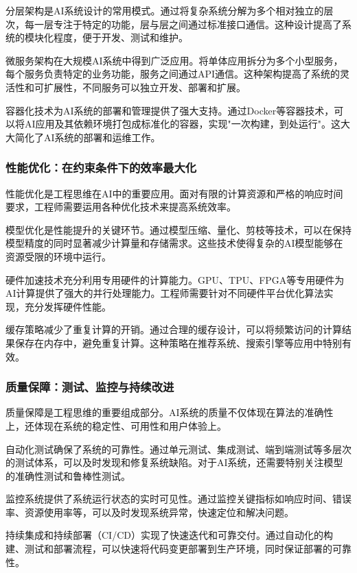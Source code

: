 分层架构是AI系统设计的常用模式。通过将复杂系统分解为多个相对独立的层次，每一层专注于特定的功能，层与层之间通过标准接口通信。这种设计提高了系统的模块化程度，便于开发、测试和维护。

微服务架构在大规模AI系统中得到广泛应用。将单体应用拆分为多个小型服务，每个服务负责特定的业务功能，服务之间通过API通信。这种架构提高了系统的灵活性和可扩展性，不同服务可以独立开发、部署和扩展。

容器化技术为AI系统的部署和管理提供了强大支持。通过Docker等容器技术，可以将AI应用及其依赖环境打包成标准化的容器，实现"一次构建，到处运行"。这大大简化了AI系统的部署和运维工作。

\subsubsection{性能优化：在约束条件下的效率最大化}

性能优化是工程思维在AI中的重要应用。面对有限的计算资源和严格的响应时间要求，工程师需要运用各种优化技术来提高系统效率。

模型优化是性能提升的关键环节。通过模型压缩、量化、剪枝等技术，可以在保持模型精度的同时显著减少计算量和存储需求。这些技术使得复杂的AI模型能够在资源受限的环境中运行。

硬件加速技术充分利用专用硬件的计算能力。GPU、TPU、FPGA等专用硬件为AI计算提供了强大的并行处理能力。工程师需要针对不同硬件平台优化算法实现，充分发挥硬件性能。

缓存策略减少了重复计算的开销。通过合理的缓存设计，可以将频繁访问的计算结果保存在内存中，避免重复计算。这种策略在推荐系统、搜索引擎等应用中特别有效。

\subsubsection{质量保障：测试、监控与持续改进}

质量保障是工程思维的重要组成部分。AI系统的质量不仅体现在算法的准确性上，还体现在系统的稳定性、可用性和用户体验上。

自动化测试确保了系统的可靠性。通过单元测试、集成测试、端到端测试等多层次的测试体系，可以及时发现和修复系统缺陷。对于AI系统，还需要特别关注模型的准确性测试和鲁棒性测试。

监控系统提供了系统运行状态的实时可见性。通过监控关键指标如响应时间、错误率、资源使用率等，可以及时发现系统异常，快速定位和解决问题。

持续集成和持续部署（CI/CD）实现了快速迭代和可靠交付。通过自动化的构建、测试和部署流程，可以快速将代码变更部署到生产环境，同时保证部署的可靠性。


